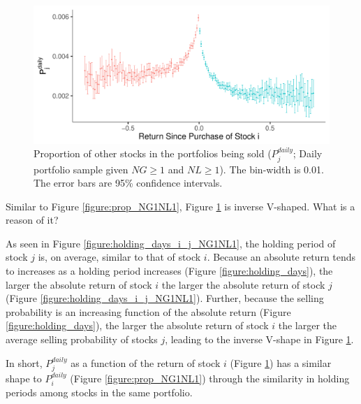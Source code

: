 \documentclass[11pt, a4paper]{article}
\begin{document}
\begin{figure}[H]
	\centering
	\includegraphics[width=0.8\columnwidth]{barc_other_sold_daily_NG1_NL1_3.pdf}
	\caption{Proportion of other stocks in the portfolios being sold ($P^{daily}_{j}$; Daily portfolio sample given $NG\geq1$ and $NL\geq1$). The bin-width is 0.01. The error bars are 95\% confidence intervals.}
	\label{figure:prop_others_NG1NL1}
\end{figure}

Similar to Figure \ref{figure:prop_NG1NL1}, Figure \ref{figure:prop_others_NG1NL1} is inverse V-shaped. What is a reason of it? 

As seen in Figure \ref{figure:holding_days_i_j_NG1NL1}, the holding period of stock $j$ is, on average, similar to that of stock $i$. Because an absolute return tends to increases as a holding period increases (Figure \ref{figure:holding_days}), the larger the absolute return of stock $i$ the larger the absolute return of stock $j$ (Figure \ref{figure:holding_days_i_j_NG1NL1}). Further, because the selling probability is an increasing function of the absolute return (Figure \ref{figure:holding_days}), the larger the absolute return of stock $i$ the larger the average selling probability of stocks $j$, leading to the inverse V-shape in Figure \ref{figure:prop_others_NG1NL1}. 


In short, $P^{daily}_{j}$ as a function of the return of stock $i$ (Figure \ref{figure:prop_others_NG1NL1}) has a similar shape to $P^{daily}_{i}$ (Figure \ref{figure:prop_NG1NL1}) through the similarity in holding periods among stocks in the same portfolio. 
\end{document}
